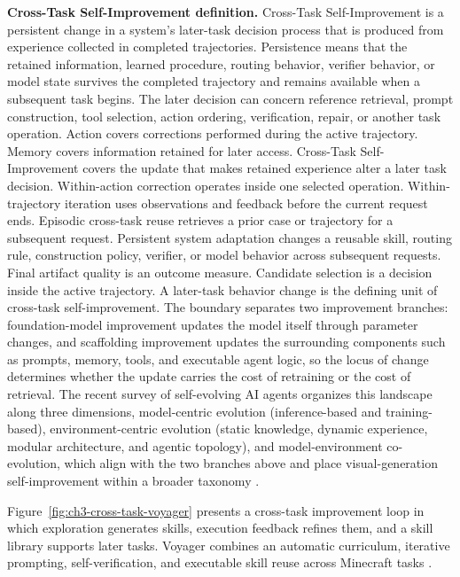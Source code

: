\textbf{Cross-Task Self-Improvement definition.} Cross-Task Self-Improvement is a persistent change in a system's later-task decision process that is produced from experience collected in completed trajectories. Persistence means that the retained information, learned procedure, routing behavior, verifier behavior, or model state survives the completed trajectory and remains available when a subsequent task begins. The later decision can concern reference retrieval, prompt construction, tool selection, action ordering, verification, repair, or another task operation. Action covers corrections performed during the active trajectory. Memory covers information retained for later access. Cross-Task Self-Improvement covers the update that makes retained experience alter a later task decision. Within-action correction operates inside one selected operation. Within-trajectory iteration uses observations and feedback before the current request ends. Episodic cross-task reuse retrieves a prior case or trajectory for a subsequent request. Persistent system adaptation changes a reusable skill, routing rule, construction policy, verifier, or model behavior across subsequent requests. Final artifact quality is an outcome measure. Candidate selection is a decision inside the active trajectory. A later-task behavior change is the defining unit of cross-task self-improvement. The boundary separates two improvement branches: foundation-model improvement updates the model itself through parameter changes, and scaffolding improvement updates the surrounding components such as prompts, memory, tools, and executable agent logic, so the locus of change determines whether the update carries the cost of retraining or the cost of retrieval. The recent survey of self-evolving AI agents organizes this landscape along three dimensions, model-centric evolution (inference-based and training-based), environment-centric evolution (static knowledge, dynamic experience, modular architecture, and agentic topology), and model-environment co-evolution, which align with the two branches above and place visual-generation self-improvement within a broader taxonomy \cite{fang2025selfevolving}.

\noindent Figure~\ref{fig:ch3-cross-task-voyager} presents a cross-task improvement loop in which exploration generates skills, execution feedback refines them, and a skill library supports later tasks. Voyager combines an automatic curriculum, iterative prompting, self-verification, and executable skill reuse across Minecraft tasks \cite{wang2023voyager}.

